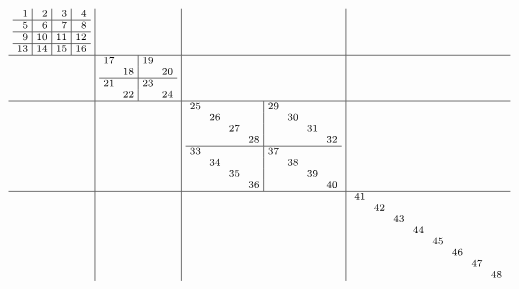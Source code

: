 \documentclass[12pt,a4paper]{amsart}
\begin{document}
\begin{align*}
\scriptsize\arraycolsep3pt
  \begin{array}{c|c|c|c}
  \begin{array}{r|r|r|r}
    1 & 2 & 3 & 4 \\\hline
    5 & 6 & 7 & 8 \\\hline
    9 & 10 & 11 & 12 \\\hline
    13 & 14 & 15 & 16
  \end{array}
  &&&\\\hline
      &
        \begin{array}{rr|rr}%
17&&19&\\%
&18&&20\\\hline
21&&23&\\%
&22&&24\\%
      \end{array}%
      &&\\\hline
    &&
\begin{array}{rrrr|rrrr}%
25&&&&29&&&\\%
&26&&&&30&&\\%
&&27&&&&31&\\%
&&&28&&&&32\\\hline%
33&&&&37&&&\\%
&34&&&&38&&\\%
&&35&&&&39&\\%
&&&36&&&&40\\%
      \end{array}%
      &\\\hline
    &&&
\begin{array}{rrrrrrrr}%
41&&&&&&&\\%
&42&&&&&&\\%
&&43&&&&&\\%
&&&44&&&&\\%
&&&&45&&&\\%
&&&&&46&&\\%
&&&&&&47&\\%
&&&&&&&48\\%
\end{array}%
  \end{array}
\end{align*}
\end{document}
